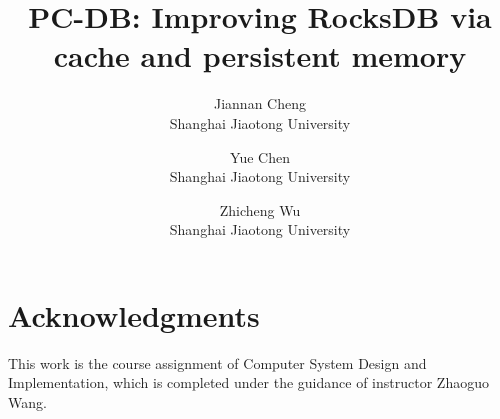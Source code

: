 \documentclass[letterpaper,twocolumn,10pt]{article}
\begin{document}

\date{}

\title{\Large \bf PC-DB: Improving RocksDB via cache and persistent memory}

\author{
{\rm Jiannan Cheng}\\
Shanghai Jiaotong University
\and
{\rm Yue Chen}\\
Shanghai Jiaotong University
\and
{\rm Zhicheng Wu}\\
Shanghai Jiaotong University
} %

\maketitle











\section*{Acknowledgments}

This work is the course assignment of Computer System Design and Implementation, which is completed under the guidance of instructor Zhaoguo Wang.





\end{document}
